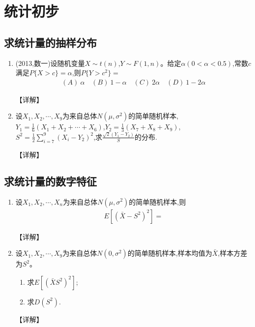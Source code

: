 \documentclass[12pt, a4paper, oneside, UTF8]{ctexbook}
\begin{document}
% 
\else
\fi

\chapter{统计初步}

\section{求统计量的抽样分布}

\begin{enumerate}[label=\arabic*.]
    \item (2013,数一)设随机变量$X\sim t(n)$,$Y\sim F(1,n)$。给定$\alpha(0<\alpha<0.5)$,常数$c$满足$P\{X>c\}=\alpha$,则$P\{Y>c^2\}=$
    \begin{align*}
        (A)\ \alpha \quad (B)\ 1-\alpha \quad (C)\ 2\alpha \quad (D)\ 1-2\alpha
    \end{align*}
    
    \begin{solution}
    【详解】
    \end{solution}
    
    \item 设$X_1,X_2,\cdots,X_9$为来自总体$N(\mu,\sigma^2)$的简单随机样本,$Y_1=\frac{1}{6}(X_1+X_2+\cdots+X_6)$,$Y_2=\frac{1}{3}(X_7+X_8+X_9)$,$S^2=\frac{1}{2}\sum_{i=7}^9(X_i-Y_2)^2$,求$\frac{\sqrt{2}(Y_1-Y_2)}{S}$的分布.
    
    \begin{solution}
    【详解】
    \end{solution}
\end{enumerate}

\section{求统计量的数字特征}

\begin{enumerate}[label=\arabic*.,start=3]
    \item 设$X_1,X_2,\cdots,X_n$为来自总体$N(\mu,\sigma^2)$的简单随机样本,则
    \begin{align*}
        E\left[\left(\bar{X}-S^2\right)^2\right]=
    \end{align*}
    
    \begin{solution}
    【详解】
    \end{solution}
    
    \item 设$X_1,X_2,\cdots,X_9$为来自总体$N(0,\sigma^2)$的简单随机样本,样本均值为$\bar{X}$,样本方差为$S^2$。
    \begin{enumerate}
        \item 求$E[(\bar{X}S^2)^2]$;
        \item 求$D(S^2)$.
    \end{enumerate}
    
    \begin{solution}
    【详解】
    \end{solution}
\end{enumerate}
\ifx\allfiles\undefined
\end{document}
